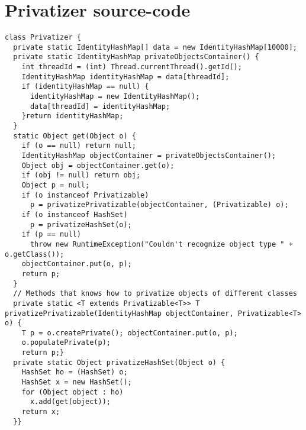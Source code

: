 \chapter{Privatizer source-code}\label{ap:Privatizer}
\begin{lstlisting}[caption={}, label =
{code:privatizer}]
class Privatizer {
  private static IdentityHashMap[] data = new IdentityHashMap[10000];
  private static IdentityHashMap privateObjectsContainer() {
    int threadId = (int) Thread.currentThread().getId();
    IdentityHashMap identityHashMap = data[threadId];
    if (identityHashMap == null) {
      identityHashMap = new IdentityHashMap();
      data[threadId] = identityHashMap;
    }return identityHashMap;
  }
  static Object get(Object o) {
    if (o == null) return null;
    IdentityHashMap objectContainer = privateObjectsContainer();
    Object obj = objectContainer.get(o);
    if (obj != null) return obj;
    Object p = null;
    if (o instanceof Privatizable)
      p = privatizePrivatizable(objectContainer, (Privatizable) o);
    if (o instanceof HashSet)
      p = privatizeHashSet(o);
    if (p == null)
      throw new RuntimeException("Couldn't recognize object type " + o.getClass());
    objectContainer.put(o, p);
    return p;
  }
  // Methods that knows how to privatize objects of different classes
  private static <T extends Privatizable<T>> T privatizePrivatizable(IdentityHashMap objectContainer, Privatizable<T> o) {
    T p = o.createPrivate(); objectContainer.put(o, p);
    o.populatePrivate(p);
    return p;}
  private static Object privatizeHashSet(Object o) {
    HashSet ho = (HashSet) o;
    HashSet x = new HashSet();
    for (Object object : ho)
      x.add(get(object));
    return x;
  }}
\end{lstlisting}
